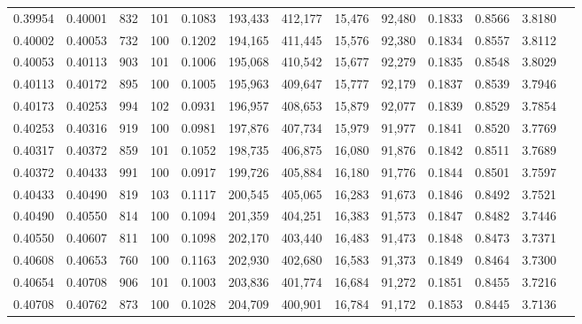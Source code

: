 \begin{tabular}{rrrrrrrrrrrrr}
0.39954 & 0.40001 &   832 & 101 &                                     0.1083 & 193,433 & 412,177 &  15,476 &  92,480 & 0.1833 & 0.8566 & 3.8180 \\
0.40002 & 0.40053 &   732 & 100 &                                     0.1202 & 194,165 & 411,445 &  15,576 &  92,380 & 0.1834 & 0.8557 & 3.8112 \\
0.40053 & 0.40113 &   903 & 101 &                                     0.1006 & 195,068 & 410,542 &  15,677 &  92,279 & 0.1835 & 0.8548 & 3.8029 \\
0.40113 & 0.40172 &   895 & 100 &                                     0.1005 & 195,963 & 409,647 &  15,777 &  92,179 & 0.1837 & 0.8539 & 3.7946 \\
0.40173 & 0.40253 &   994 & 102 &                                     0.0931 & 196,957 & 408,653 &  15,879 &  92,077 & 0.1839 & 0.8529 & 3.7854 \\
0.40253 & 0.40316 &   919 & 100 &                                     0.0981 & 197,876 & 407,734 &  15,979 &  91,977 & 0.1841 & 0.8520 & 3.7769 \\
0.40317 & 0.40372 &   859 & 101 &                                     0.1052 & 198,735 & 406,875 &  16,080 &  91,876 & 0.1842 & 0.8511 & 3.7689 \\
0.40372 & 0.40433 &   991 & 100 &                                     0.0917 & 199,726 & 405,884 &  16,180 &  91,776 & 0.1844 & 0.8501 & 3.7597 \\
0.40433 & 0.40490 &   819 & 103 &                                     0.1117 & 200,545 & 405,065 &  16,283 &  91,673 & 0.1846 & 0.8492 & 3.7521 \\
0.40490 & 0.40550 &   814 & 100 &                                     0.1094 & 201,359 & 404,251 &  16,383 &  91,573 & 0.1847 & 0.8482 & 3.7446 \\
0.40550 & 0.40607 &   811 & 100 &                                     0.1098 & 202,170 & 403,440 &  16,483 &  91,473 & 0.1848 & 0.8473 & 3.7371 \\
0.40608 & 0.40653 &   760 & 100 &                                     0.1163 & 202,930 & 402,680 &  16,583 &  91,373 & 0.1849 & 0.8464 & 3.7300 \\
0.40654 & 0.40708 &   906 & 101 &                                     0.1003 & 203,836 & 401,774 &  16,684 &  91,272 & 0.1851 & 0.8455 & 3.7216 \\
0.40708 & 0.40762 &   873 & 100 &                                     0.1028 & 204,709 & 400,901 &  16,784 &  91,172 & 0.1853 & 0.8445 & 3.7136 \\

\end{tabular}
